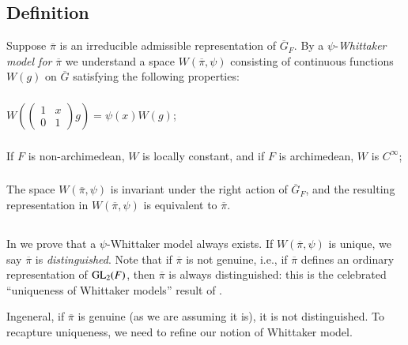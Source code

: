 \subsection{Definition}\label{art1-defi3.1}
Suppose $\overline{\pi}$ is an irreducible admissible representation of $\overline{G}_{F}$. By a $\psi$-{\em Whittaker model for} $\overline{\pi}$ we understand a space $W(\overline{\pi},\psi)$ consisting of continuous functions $W(g)$ on $\overline{G}$ satisfying the following properties:

\subsubsection{}\label{art1-sec3.1.1}
$W\left(\left(\begin{smallmatrix} 1 & x\\ 0 & 1\end{smallmatrix}\right)g\right)=\psi(x)W(g)$;

\subsubsection{}\label{art1-sec3.1.2}
If $F$ is non-archimedean, $W$ is locally constant, and if $F$ is archi\-medean, $W$ is $C^{\infty}$;

\subsubsection{}\label{art1-sec3.1.3}
The space $W(\overline{\pi},\psi)$ is invariant under the right action of $\overline{G}_{F}$, and the resulting representation in $W(\overline{\pi},\psi)$ is equivalent to $\overline{\pi}$.

\subsection{}\label{art1-sec3.2}
In \cite{GeHPS} we prove that a $\psi$-Whittaker model always exists. If $W(\overline{\pi},\psi)$ is unique, we say $\overline{\pi}$ is {\em distinguished}. Note that if $\overline{\pi}$ is not genuine, i.e., if $\overline{\pi}$ defines an ordinary representation of $\mathrm{GL}_{2}(F)$, then $\overline{\pi}$ is always distinguished: this is the celebrated ``uniqueness of Whittaker models'' result of \cite{Jacquet-Langlands}.

In\pageoriginale general, if $\overline{\pi}$ is genuine (as we are assuming it is), it is not distinguished. To recapture uniqueness, we need to refine our notion of Whittaker model.

